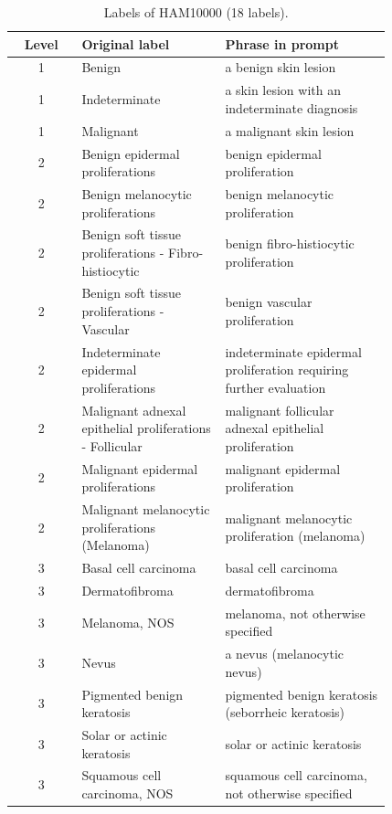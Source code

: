 \begin{table}[htbp]
\centering
\small
\caption{Labels of HAM10000 (18 labels).}\label{tab:labels_HAM10000}
\begin{tabular}{cp{0.38\linewidth}p{0.44\linewidth}}
\toprule
Level & Original label & Phrase in prompt \\
\midrule
1 & Benign & a benign skin lesion \\
1 & Indeterminate & a skin lesion with an indeterminate diagnosis \\
1 & Malignant & a malignant skin lesion \\
2 & Benign epidermal proliferations & benign epidermal proliferation \\
2 & Benign melanocytic proliferations & benign melanocytic proliferation \\
2 & Benign soft tissue proliferations - Fibro-histiocytic & benign fibro-histiocytic proliferation \\
2 & Benign soft tissue proliferations - Vascular & benign vascular proliferation \\
2 & Indeterminate epidermal proliferations & indeterminate epidermal proliferation requiring further evaluation \\
2 & Malignant adnexal epithelial proliferations - Follicular & malignant follicular adnexal epithelial proliferation \\
2 & Malignant epidermal proliferations & malignant epidermal proliferation \\
2 & Malignant melanocytic proliferations (Melanoma) & malignant melanocytic proliferation (melanoma) \\
3 & Basal cell carcinoma & basal cell carcinoma \\
3 & Dermatofibroma & dermatofibroma \\
3 & Melanoma, NOS & melanoma, not otherwise specified \\
3 & Nevus & a nevus (melanocytic nevus) \\
3 & Pigmented benign keratosis & pigmented benign keratosis (seborrheic keratosis) \\
3 & Solar or actinic keratosis & solar or actinic keratosis \\
3 & Squamous cell carcinoma, NOS & squamous cell carcinoma, not otherwise specified \\
\bottomrule
\end{tabular}
\end{table}


